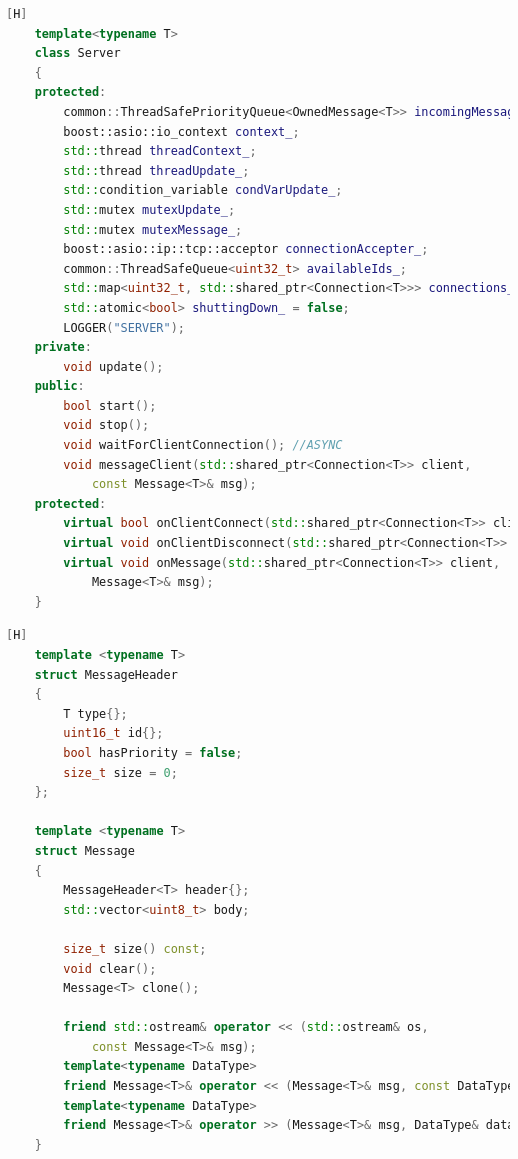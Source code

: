 \documentclass[17pt]{report}
\begin{document}
\pagebreak

\begin{lstlisting}[language = C++][H]
    template<typename T>
    class Server
    {
    protected:
        common::ThreadSafePriorityQueue<OwnedMessage<T>> incomingMessagesQueue_;
        boost::asio::io_context context_;
        std::thread threadContext_;
        std::thread threadUpdate_;
        std::condition_variable condVarUpdate_;
        std::mutex mutexUpdate_;
        std::mutex mutexMessage_;
        boost::asio::ip::tcp::acceptor connectionAccepter_;
        common::ThreadSafeQueue<uint32_t> availableIds_;
        std::map<uint32_t, std::shared_ptr<Connection<T>>> connections_;
        std::atomic<bool> shuttingDown_ = false;
        LOGGER("SERVER");
    private:
        void update();
    public:
        bool start();
        void stop();
        void waitForClientConnection(); //ASYNC
        void messageClient(std::shared_ptr<Connection<T>> client,
            const Message<T>& msg);
    protected:
        virtual bool onClientConnect(std::shared_ptr<Connection<T>> client);
        virtual void onClientDisconnect(std::shared_ptr<Connection<T>> client);
        virtual void onMessage(std::shared_ptr<Connection<T>> client,
            Message<T>& msg);
    }
\end{lstlisting}

\pagebreak

\begin{lstlisting}[language = C++][H]
    template <typename T>
    struct MessageHeader
    {
        T type{};
        uint16_t id{};
        bool hasPriority = false;
        size_t size = 0;
    };
    
    template <typename T>
    struct Message
    {
        MessageHeader<T> header{};
        std::vector<uint8_t> body;

        size_t size() const;
        void clear();
        Message<T> clone();

        friend std::ostream& operator << (std::ostream& os, 
            const Message<T>& msg);
        template<typename DataType>
        friend Message<T>& operator << (Message<T>& msg, const DataType& data)
        template<typename DataType>
        friend Message<T>& operator >> (Message<T>& msg, DataType& data)
    }
\end{lstlisting}  

\pagebreak
\end{document}
